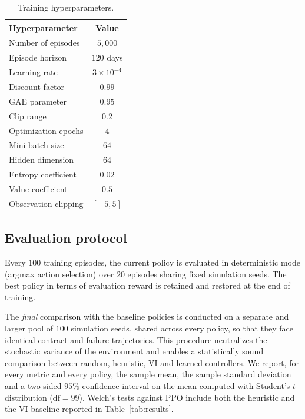 \begin{table}[h]
\centering
\begin{tabular}{lc}
\toprule
Hyperparameter & Value \\
\midrule
Number of episodes            & $5{,}000$ \\
Episode horizon               & $120$ days \\
Learning rate                 & $3 \times 10^{-4}$ \\
Discount factor               & $0.99$ \\
GAE parameter                 & $0.95$ \\
Clip range                    & $0.2$ \\
Optimization epochs           & $4$ \\
Mini-batch size               & $64$ \\
Hidden dimension              & $64$ \\
Entropy coefficient           & $0.02$ \\
Value coefficient             & $0.5$ \\
Observation clipping          & $[-5, 5]$ \\
\bottomrule
\end{tabular}
\caption{Training hyperparameters.}
\label{tab:hparams}
\end{table}


\subsection{Evaluation protocol}
\label{subsec:eval-protocol}

Every $100$ training episodes, the current policy is evaluated in
deterministic mode (argmax action selection) over $20$ episodes sharing
fixed simulation seeds. The best policy in terms of evaluation reward is
retained and restored at the end of training.

The \emph{final} comparison with the baseline policies is conducted on
a separate and larger pool of $100$ simulation seeds, shared across every
policy, so that they face identical contract and failure trajectories.
This procedure neutralizes the stochastic variance of the environment and
enables a statistically sound comparison between random, heuristic, VI and
learned controllers. We report,
for every metric and every policy, the sample mean, the sample standard
deviation and a two-sided $95\%$ confidence interval on the mean
computed with Student's $t$-distribution ($\mathrm{df}=99$). Welch's tests
against PPO include both the heuristic and the VI baseline reported in Table~\ref{tab:results}.

